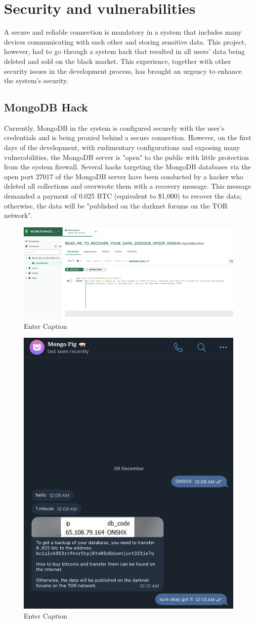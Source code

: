 \documentclass[../Main.tex]{subfiles}
\begin{document}
\section{Security and vulnerabilities}
A secure and reliable connection is mandatory in a system that includes many devices communicating with each other and storing sensitive data. This project, however, had to go through a system hack that resulted in all users' data being deleted and sold on the black market. This experience, together with other security issues in the development process, has brought an urgency to enhance the system's security.
\subsection{MongoDB Hack}
Currently, MongoDB in the system is configured securely with the user's credentials and is being proxied behind a secure connection. However, on the first days of the development, with rudimentary configurations and exposing many vulnerabilities, the MongoDB server is "open" to the public with little protection from the system firewall. Several hacks targeting the MongoDB databases via the open port 27017 of the MongoDB server have been conducted by a hacker who deleted all collections and overwrote them with a recovery message. This message demanded a payment of 0.025 BTC (equivalent to \$1,000) to recover the data; otherwise, the data will be "published on the darknet forums on the TOR network".
\begin{figure}[H]
    \centering
    \includegraphics[width=0.9\linewidth]{doc/imgs/mongo-hack.png}
    \caption{Enter Caption}
    \label{fig:enter-label}
\end{figure}
\begin{figure}[H]
    \centering
    \includegraphics[width=0.5\linewidth]{doc/imgs/mongo-pig.png}
    \caption{Enter Caption}
    \label{fig:enter-label}
\end{figure}
\end{document}
